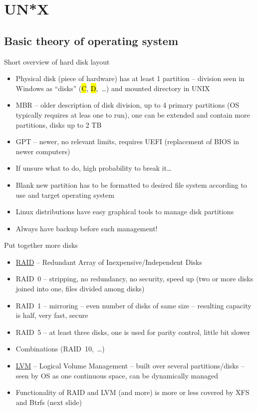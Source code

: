 \documentclass[compress, ucs, xelatex, 11pt, xcolor=svgnames,
  hyperref={
    bookmarks=true,
    unicode=true,
    colorlinks=true,
    pdftitle={Linux, command line and MetaCentrum},
    plainpages=false,
    pdfauthor={Vojtech Zeisek},
    pdfsubject={Course about use of Linux command line, writing shell scripts and using MetaCentrum of CESNET},
    pdfcreator={XeLaTeX},
    pdfkeywords={Linux, GNU, BASH, shell, command line, MetaCentrum},
    linkcolor=DarkRed,
    anchorcolor=DarkBlue,
    citecolor=Indigo,
    filecolor=NavyBlue,
    menucolor=DarkMagenta,
    urlcolor=DarkBlue,
    pdftex},
  url={hyphens, lowtilde} %
  ]{beamer}
\renewcommand{\texttt}[1]{\hl{\ttfamily #1}}
\begin{document}
\section{UN*X}

\subsection{Basic theory of operating system}

\begin{frame}{Short overview of hard disk layout}
\begin{itemize}
  \item Physical disk (piece of hardware) has at least 1 partition -- division seen in Windows as ``disks'' (\texttt{C}, \texttt{D},~\ldots) and mounted directory in UNIX
  \item MBR -- older description of disk division, up to 4 primary partitions (OS typically requires at leas one to run), one can be extended and contain more partitions, disks up to 2 TB
  \item GPT -- newer, no relevant limits, requires UEFI (replacement of BIOS in newer computers)
  \item If unsure what to do, high probability to break it\ldots
  \item Blank new partition has to be formatted to desired file system according to use and target operating system
  \item Linux distributions have easy graphical tools to manage disk partitions
  \item Always have backup before such management!
\end{itemize}
\end{frame}

\begin{frame}{Put together more disks}
\begin{itemize}
  \item \href{https://en.wikipedia.org/wiki/RAID}{RAID} -- Redundant Array of Inexpensive/Independent Disks
  \item RAID~0 -- stripping, no redundancy, no security, speed up (two or more disks joined into one, files divided among disks)
  \item RAID~1 -- mirroring -- even number of disks of same size -- resulting capacity is half, very fast, secure
  \item RAID~5 -- at least three disks, one is used for parity control, little bit slower
  \item Combinations (RAID~10,~\ldots)
  \item \href{https://en.wikipedia.org/wiki/Logical_volume_management}{LVM} -- Logical Volume Management -- built over several partitions/disks -- seen by OS as one continuous space, can be dynamically managed
  \item Functionality of RAID and LVM (and more) is more or less covered by XFS and Btrfs (next slide)
\end{itemize}
\end{frame}
\end{document}
